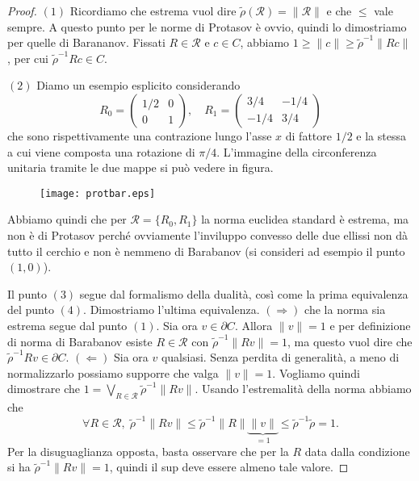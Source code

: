 \begin{proof}
	$(1)$ Ricordiamo che estrema vuol dire $\tilde\rho(\mathcal R) = \|\mathcal R\|$ e che $\leq$ vale sempre. A questo punto per le norme di Protasov è ovvio, quindi lo dimostriamo per quelle di Barananov. Fissati $R\in\mathcal R$ e $c\in C$, abbiamo $1\geq\|c\|\geq\tilde\rho^{-1}\|Rc\|$, per cui $\tilde\rho^{-1}Rc\in C$.
	
	$(2)$ Diamo un esempio esplicito considerando 
	$$R_{0} = \begin{pmatrix}1/2 & 0\\0 & 1\end{pmatrix},\quad R_{1} = \begin{pmatrix}3/4 & -1/4\\-1/4 & 3/4\end{pmatrix}$$
	che sono rispettivamente una contrazione lungo l'asse $x$ di fattore $1/2$ e la stessa a cui viene composta una rotazione di $\pi/4$. L'immagine della circonferenza unitaria tramite le due mappe si può vedere in figura. 
	\begin{figure}[htbp]
	\begin{center}
	\texttt{[image: protbar.eps]}
	\end{center}
	\end{figure}
	Abbiamo quindi che per $\mathcal R = \{R_{0}, R_{1}\}$ la norma euclidea standard è estrema, ma non è di Protasov perché ovviamente l'inviluppo convesso delle due ellissi non dà tutto il cerchio e non è nemmeno di Barabanov (si consideri ad esempio il punto $(1,0)$).
	
	Il punto $(3)$ segue dal formalismo della dualità, così come la prima equivalenza del punto $(4)$. Dimostriamo l'ultima equivalenza. $(\Rightarrow)$ che la norma sia estrema segue dal punto $(1)$. Sia ora $v\in\partial C$. Allora $\|v\| = 1$ e per definizione di norma di Barabanov esiste $R\in\mathcal R$ con $\tilde\rho^{-1}\|Rv\| = 1$, ma questo vuol dire che $\tilde\rho^{-1}Rv\in\partial C$. 
	$(\Leftarrow)$ Sia ora $v$ qualsiasi. Senza perdita di generalità, a meno di normalizzarlo possiamo supporre che valga $\|v\| = 1$. Vogliamo quindi dimostrare che $1 = \bigvee_{R\in\mathcal R}\tilde\rho^{-1}\|Rv\|$. Usando l'estremalità della norma abbiamo che
	$$\forall R\in\mathcal R,\; \tilde\rho^{-1}\|Rv\|\leq\tilde\rho^{-1}\|R\|\underbrace{\|v\|}_{=1} \leq \tilde\rho^{-1}\tilde\rho = 1.$$
	Per la disuguaglianza opposta, basta osservare che per la $R$ data dalla condizione si ha $\tilde\rho^{-1}\|Rv\| = 1$, quindi il sup deve essere almeno tale valore.
\end{proof}

